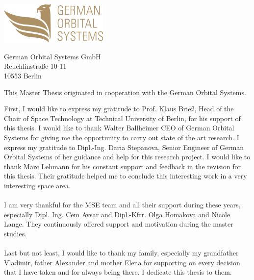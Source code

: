 \thispagestyle{empty}
\vspace*{3cm}


\begin{center}
\includegraphics[width=0.4\textwidth]{logo.png}
\end{center}

\vspace*{0.2cm}

\begin{center}
German Orbital Systems GmbH\\
Reuchlinstraße 10-11\\
10553 Berlin\\
\end{center}
\vspace*{0.5cm}

\noindent This Master Thesis originated in cooperation with the German Orbital Systems.

\vspace*{1cm}
\noindent 
First, I would like to express my gratitude to Prof. Klaus Brieß, Head of the Chair of Space
Technology at Technical University of Berlin, for his support of this thesis.
I would like to thank Walter Ballheimer CEO of German Orbital Systems for giving me the opportunity to carry out state of the art research. I express my gratitude to Dipl.-Ing. Daria Stepanova, Senior Engineer of German Orbital Systems of her guidance and help for this research project. I would like to thank Marc Lehmann for his constant support and feedback in the revision  for this thesis. Their gratitude helped me to conclude this interesting work in a very interesting space area.
\\
\\
I am very thankful for the MSE team and all their support during these years,  especially Dipl.
Ing. Cem Avsar and Dipl.-Kfrr. Olga Homakova and Nicole Lange. They continuously offered support and
motivation during the master studies.
\\
\\
Last but not least, I would like to thank my family, especially my grandfather Vladimir, father Alexander
and mother Elena for supporting on every decision that I have taken and for always being
there. I dedicate this thesis to them.